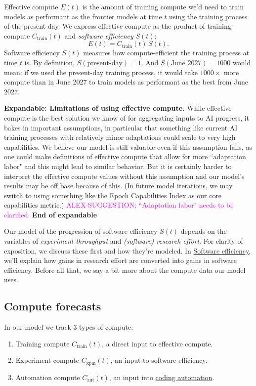 \documentclass{article}
\theoremstyle{definition}
\newcommand{\ASUG}[1]{\textcolor{magenta}{ALEX-SUGGESTION: #1}}
\begin{document}
Effective compute $E(t)$ is the amount of training compute we'd need to train models as performant as the frontier models at time $t$ using the training process of the present-day. We express effective compute as the product of training compute $C_\text{train}(t)$ and \textit{software efficiency} $S(t)$:
\[ E(t) = C_\text{train}(t) \, S(t).\]
Software efficiency $S(t)$ measures how compute-efficient the training process at time $t$ is. By definition, $S(\text{present-day}) = 1$. And $S(\text{June 2027}) = 1000$ would mean: if we used the present-day training process, it would take $1000 \times$ more compute than in June 2027 to train models as performant as the best from June 2027.

\textbf{Expandable: Limitations of using effective compute.}
While effective compute is the best solution we know of for aggregating inputs to AI progress, it bakes in important assumptions, in particular that something like current AI training processes with relatively minor adaptations could scale to very high capabilities. We believe our model is still valuable even if this assumption fails, as one could make definitions of effective compute that allow for more ``adaptation labor" and this might lead to similar behavior. But it is certainly harder to interpret the effective compute values without this assumption and our model's results may be off base because of this. (In future model iterations, we may switch to using something like the Epoch Capabilities Index as our core capabilities metric.) \ASUG{``Adaptation labor" needs to be clarified.}
\textbf{End of expandable}

Our model of the progression of software efficiency $S(t)$ depends on the variables of \textit{experiment throughput} and \textit{(software) research effort}. For clarity of exposition, we discuss these first and how they're modeled. In \hyperref[a later section]{Software efficiency}, we'll explain how gains in research effort are converted into gains in software efficiency. Before all that, we say a bit more about the compute data our model uses.

\subsection{Compute forecasts} \label{Compute}

In our model we track 3 types of compute:
\begin{enumerate}
    \item Training compute $C_\text{train}(t)$, a direct input to effective compute.
    \item Experiment compute $C_\text{xpm}(t)$, an input to software efficiency.
    \item Automation compute $C_\text{aut}(t)$, an input into \hyperref[Coding automation]{coding automation}.
\end{enumerate}
\end{document}
